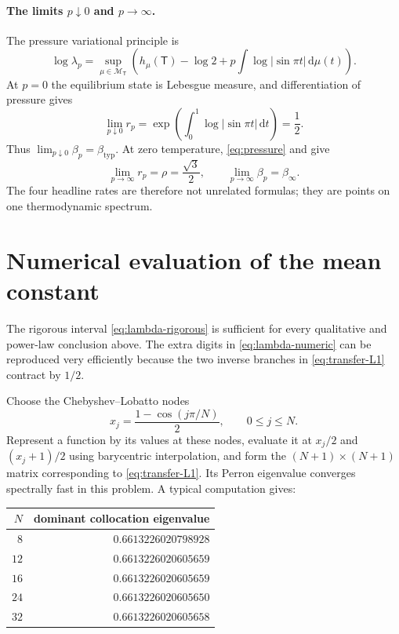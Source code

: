 \documentclass[11pt,oneside]{article}
\theoremstyle{definition}
\theoremstyle{remark}
\newcommand{\dd}{\,\mathrm d}
\newcommand{\T}{\mathsf T}
\begin{document}
\paragraph{The limits $p\downarrow0$ and $p\to\infty$.}
The pressure variational principle is
\begin{equation}\label{eq:pressure}
 \log\lambda_p
 =\sup_{\mu\in\mathcal M_\T}
 \left(h_\mu(\T)-\log2
 +p\int\log|\sin\pi t|\dd\mu(t)\right).
\end{equation}
At $p=0$ the equilibrium state is Lebesgue measure, and differentiation of pressure gives
\[
 \lim_{p\downarrow0}r_p
 =\exp\!\left(\int_0^1\log|\sin\pi t|\dd t\right)=\frac12.
\]
Thus $\lim_{p\downarrow0}\beta_p=\beta_{\mathrm{typ}}$.  At zero temperature,
\eqref{eq:pressure} and  give
\[
 \lim_{p\to\infty}r_p=\rho=\frac{\sqrt3}{2},
 \qquad
 \lim_{p\to\infty}\beta_p=\beta_\infty.
\]
The four headline rates are therefore not unrelated formulas; they are points on one
thermodynamic spectrum.

\section{Numerical evaluation of the mean constant}\label{sec:numerics}

The rigorous interval \eqref{eq:lambda-rigorous} is sufficient for every qualitative and
power-law conclusion above.  The extra digits in \eqref{eq:lambda-numeric} can be
reproduced very efficiently because the two inverse branches in \eqref{eq:transfer-L1}
contract by $1/2$.

Choose the Chebyshev--Lobatto nodes
\begin{equation}\label{eq:cheb-nodes}
 x_j=\frac{1-\cos(j\pi/N)}2,
 \qquad 0\le j\le N.
\end{equation}
Represent a function by its values at these nodes, evaluate it at $x_j/2$ and
$(x_j+1)/2$ using barycentric interpolation, and form the $(N+1)\times(N+1)$ matrix
corresponding to \eqref{eq:transfer-L1}.  Its Perron eigenvalue converges spectrally fast
in this problem.  A typical computation gives:

\begin{center}
\begin{tabular}{@{}rr@{}}
\toprule
$N$ & dominant collocation eigenvalue \\
\midrule
$8$  & $0.6613226020798928$ \\
$12$ & $0.6613226020605659$ \\
$16$ & $0.6613226020605659$ \\
$24$ & $0.6613226020605650$ \\
$32$ & $0.6613226020605658$ \\
\bottomrule
\end{tabular}
\end{center}
\end{document}
